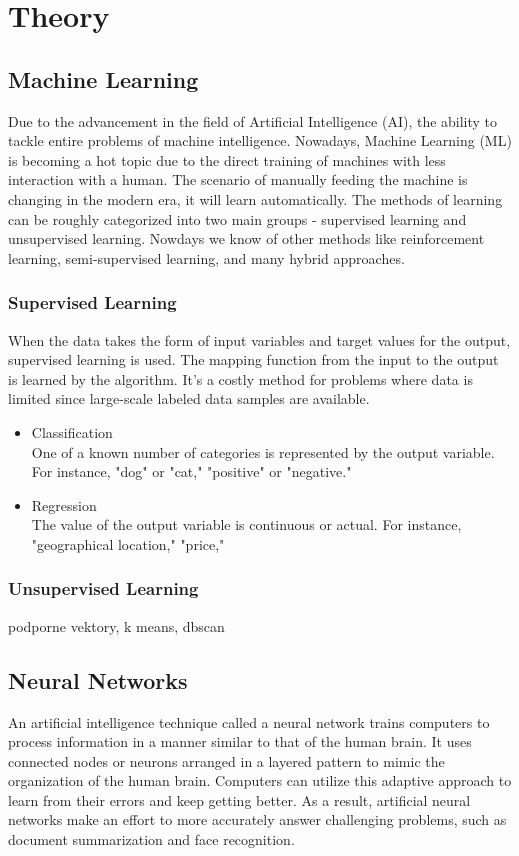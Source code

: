 \chapter{Theory}


\section{Machine Learning}

Due to the advancement in the field of Artificial Intelligence (AI), the ability to tackle entire problems of machine intelligence. Nowadays, Machine Learning (ML) is becoming a hot topic due to the direct training of machines with less interaction with a human. The scenario of manually feeding the machine is changing in the modern era, it will learn automatically. The methods of learning can be roughly categorized into two main groups - supervised learning and unsupervised learning. Nowdays we know of other methods like reinforcement learning, semi-supervised learning, and many hybrid approaches.

\subsection{Supervised Learning}
When the data takes the form of input variables and target values for the output, supervised learning is used. The mapping function from the input to the output is learned by the algorithm. It's a costly method for problems where data is limited since large-scale labeled data samples are available. 
 \begin{itemize}[]
 	\item Classification\\
 	One of a known number of categories is represented by the output variable. For instance, "dog" or "cat," "positive" or "negative."
 	\item Regression\\
 	The value of the output variable is continuous or actual. For instance, "geographical location," "price,"
 \end{itemize}

\subsection{Unsupervised Learning}
podporne vektory, k means, dbscan

\section{Neural Networks}
An artificial intelligence technique called a neural network trains computers to process information in a manner similar to that of the human brain. It uses connected nodes or neurons arranged in a layered pattern to mimic the organization of the human brain. Computers can utilize this adaptive approach to learn from their errors and keep getting better. As a result, artificial neural networks make an effort to more accurately answer challenging problems, such as document summarization and face recognition.



